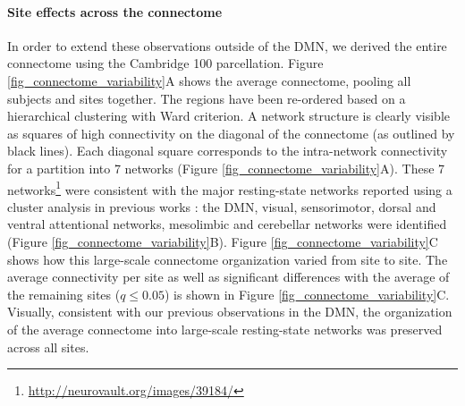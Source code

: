 \documentclass[authoryear]{elsarticle}
\begin{document}
\paragraph{Site effects across the connectome} In order to extend these
observations outside of the DMN, we derived the entire connectome using the
Cambridge 100 parcellation. Figure \ref{fig_connectome_variability}A shows the
average connectome, pooling all subjects and sites together. The regions have
been re-ordered based on a hierarchical clustering with Ward criterion. A
network structure is clearly visible as squares of high connectivity on the
diagonal of the connectome (as outlined by black lines). Each diagonal square
corresponds to the intra-network connectivity for a partition into 7 networks (Figure \ref{fig_connectome_variability}A). These 7 networks\footnote{\url{http://neurovault.org/images/39184/}} were
consistent with the major resting-state networks reported using a cluster
analysis in previous works \citep[e.g.][]{Heuvel2008, Bellec2010, Yeo2011,
Power2011}: the DMN, visual, sensorimotor, dorsal and ventral attentional
networks, mesolimbic and cerebellar networks were
identified (Figure \ref{fig_connectome_variability}B). Figure \ref{fig_connectome_variability}C shows how this large-scale
connectome organization varied from site to site. The average connectivity per
site as well as significant differences with the average of the remaining sites
($q\leq 0.05$) is shown in Figure \ref{fig_connectome_variability}C.
Visually, consistent with our previous observations in the DMN, the organization
of the average connectome into large-scale resting-state networks was preserved
across all sites. 
\end{document}
